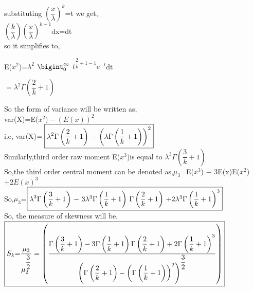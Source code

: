 \documentclass[12pt,a4paper,oneside]{article}
\begin{document}
substituting $\left(\dfrac{x}{{\lambda}}\right)^{k}$=t we get,\\
\newline
\hspace{2cm}$\left(\dfrac{k}{\lambda}\right)\left(\dfrac{x}{{\lambda}}\right)^{k-1}$dx=dt\\
\newline so it simplifies to,
\begin{center}
\hspace{3cm}E($x^{2}$)=${\lambda}^{2}$ $\bigint_{0}^{\infty}$ $t^{\dfrac{2}{k}+1-1}e^{-t}$dt\\
\begin{singlespace}
\hspace{3.2cm}$=\boxed{{\lambda}^{2}\Gamma\left(\dfrac{2}{k}+1\right)}$
\end{singlespace}
\end{center}
So the form of variance will  be written as,\\
\newline
var(X)=E($x^{2})-(E(x))^{2}$\\
\newline
i.e, var(X)$=\boxed{{\lambda}^{2}\Gamma\left(\dfrac{2}{k}+1\right)$ $-$ $\left({\lambda}\Gamma\left(\dfrac{1}{k}+1\right)\right)^{2}}$\\
\newline
Similarly,third order raw moment E($x^{3}$)is equal to  ${\lambda}^{3}\Gamma\left(\dfrac{3}{k}+1\right)$\\
\newline\newline So,the third order central moment can be denoted as,$\mu_{3}$=E($x^{3}$) $-$ 3E(x)E($x^{2}$) $+2E(x)^{3}$\\
\newline\newline So,$\mu_{3}$=$\boxed{{\lambda}^{3}\Gamma\left(\dfrac{3}{k}+1\right)$ $-$ 3${\lambda}^{3}\Gamma\left(\dfrac{1}{k}+1\right)$ $\Gamma\left(\dfrac{2}{k}+1\right)$ $+$2${\lambda}^{3}\Gamma\left(\dfrac{1}{k}+1\right)^{3}}$\\
\newpage So, the measure of skewness will be,\\$\boxed{S_{k}$=$\dfrac{\mu_{3}}{\mu_{2}^{\dfrac{3}{2}}}=\left(\dfrac{\Gamma\left(\dfrac{3}{k}+1\right) - 3\Gamma\left(\dfrac{1}{k}+1\right) \Gamma\left(\dfrac{2}{k}+1\right) +2\Gamma\left(\dfrac{1}{k}+1\right)^{3}}{\left(\Gamma\left(\dfrac{2}{k}+1\right) - \left(\Gamma\left(\dfrac{1}{k}+1\right)\right)^{2}\right)^{\dfrac{3}{2}}}\right)}$\\
\end{document}
